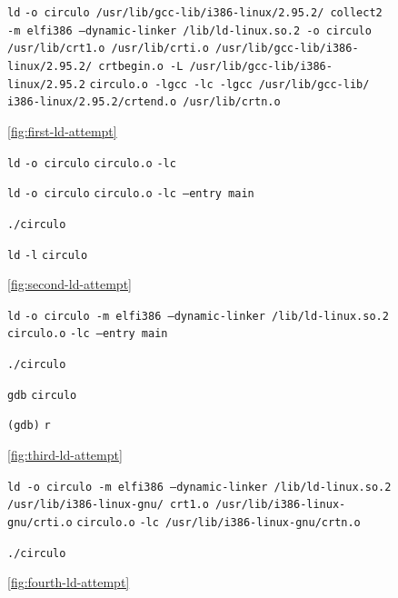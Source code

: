 \documentclass[11pt]{article}
\newcommand{\codetext}[2]{\large\texttt{\textcolor{#1}{#2}}}
\newcommand{\imagecaption}[1]{\vspace{-7pt}\caption*{\char91\ref{fig:#1}\char93}}
\begin{document}
		\begin{figure}[H]
			\centering
			\begin{code-box}
			\codetext{light-blue}{ld} \codetext{orange-desert-vim}{-o circulo /usr/lib/gcc-lib/i386-linux/2.95.2/ collect2 -m elf\textunderscore{}i386 --dynamic-linker /lib/ld-linux.so.2 -o circulo /usr/lib/crt1.o /usr/lib/crti.o /usr/lib/gcc-lib/i386-linux/2.95.2/ crtbegin.o -L /usr/lib/gcc-lib/i386-linux/2.95.2} \codetext{light-red}{circulo.o }\codetext{orange-desert-vim}{-lgcc -lc -lgcc /usr/lib/gcc-lib/ i386-linux/2.95.2/crtend.o /usr/lib/crtn.o}
			\end{code-box}
			\imagecaption{first-ld-attempt}
		\end{figure}
		
		\begin{figure}[H]
			\centering
			\begin{code-box}
				\codetext{light-blue}{ld} \codetext{orange-desert-vim}{-o circulo} \codetext{light-red}{circulo.o} \codetext{orange-desert-vim}{-lc}
				
				\codetext{light-blue}{ld} \codetext{orange-desert-vim}{-o circulo} \codetext{light-red}{circulo.o} \codetext{orange-desert-vim}{-lc --entry main}
				
				\codetext{light-blue}{./circulo}
				
				\codetext{light-blue}{ld} \codetext{orange-desert-vim}{-l} \codetext{light-red}{circulo}
			\end{code-box}
			\imagecaption{second-ld-attempt}
		\end{figure}
		
		\begin{figure}[H]
			\centering
			\begin{code-box}
				\codetext{light-blue}{ld} \codetext{orange-desert-vim}{-o circulo -m elf\textunderscore\/i386 --dynamic-linker /lib/ld-linux.so.2} \codetext{light-red}{circulo.o} \codetext{orange-desert-vim}{-lc --entry main}
				
				\codetext{light-blue}{./circulo}
				
				\codetext{light-blue}{gdb} \codetext{light-red}{circulo}
				
				\codetext{light-green}{(gdb)} \codetext{light-blue}{r}
			\end{code-box}
			\imagecaption{third-ld-attempt}
		\end{figure}
		
		\begin{figure}[H]
			\centering
			\begin{code-box}
				\codetext{light-blue}{ld }\codetext{orange-desert-vim}{-o circulo -m elf\textunderscore\/i386 --dynamic-linker /lib/ld-linux.so.2 /usr/lib/i386-linux-gnu/ crt1.o /usr/lib/i386-linux-gnu/crti.o} \codetext{light-red}{circulo.o} \codetext{orange-desert-vim}{-lc /usr/lib/i386-linux-gnu/crtn.o}
				
				\codetext{light-blue}{./circulo}
			\end{code-box}
			\imagecaption{fourth-ld-attempt}
		\end{figure}
		
\end{document}
